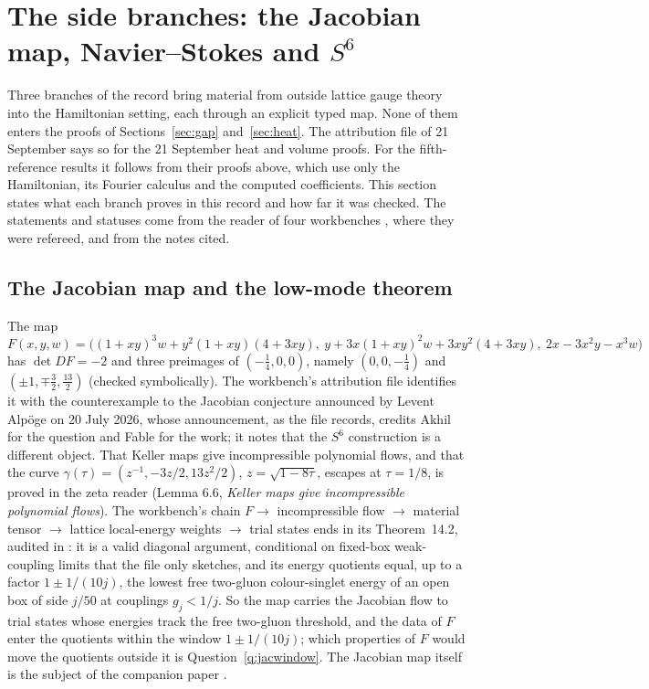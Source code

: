 \section{The side branches: the Jacobian map, Navier--Stokes and \texorpdfstring{$S^6$}{S6}}\label{sec:side}

Three branches of the record bring material from outside lattice gauge theory into the Hamiltonian setting, each through an explicit typed map. None of them enters the proofs of Sections~\ref{sec:gap} and~\ref{sec:heat}. The attribution file of 21 September says so for the 21 September heat and volume proofs. For the fifth-reference results it follows from their proofs above, which use only the Hamiltonian, its Fourier calculus and the computed coefficients. This section states what each branch proves in this record and how far it was checked. The statements and statuses come from the reader of four workbenches \cite{WorkbenchReader}, where they were refereed, and from the notes cited.

\subsection{The Jacobian map and the low-mode theorem}

The map
\[
F(x,y,w)=\bigl((1+xy)^3w+y^2(1+xy)(4+3xy),\ y+3x(1+xy)^2w+3xy^2(4+3xy),\ 2x-3x^2y-x^3w\bigr)
\]
has $\det DF=-2$ and three preimages of $(-\frac14,0,0)$, namely $(0,0,-\frac14)$ and $(\pm1,\mp\frac32,\frac{13}2)$ (checked symbolically). The workbench's attribution file identifies it with the counterexample to the Jacobian conjecture announced by Levent Alpöge on 20 July 2026, whose announcement, as the file records, credits Akhil for the question and Fable for the work; it notes that the $S^6$ construction is a different object. That Keller maps give incompressible polynomial flows, and that the curve $\gamma(\tau)=(z^{-1},-3z/2,13z^2/2)$, $z=\sqrt{1-8\tau}$, escapes at $\tau=1/8$, is proved in the zeta reader \cite{ZetaReader} (Lemma 6.6, \emph{Keller maps give incompressible polynomial flows}).
The workbench's chain $F\to$ incompressible flow $\to$ material tensor $\to$ lattice local-energy weights $\to$ trial states ends in its Theorem~14.2, audited in : it is a valid diagonal argument, conditional on fixed-box weak-coupling limits that the file only sketches, and its energy quotients equal, up to a factor $1\pm1/(10j)$, the lowest free two-gluon colour-singlet energy of an open box of side $j/50$ at couplings $g_j<1/j$. So the map carries the Jacobian flow to trial states whose energies track the free two-gluon threshold, and the data of $F$ enter the quotients within the window $1\pm1/(10j)$; which properties of $F$ would move the quotients outside it is Question~\ref{q:jacwindow}. The Jacobian map itself is the subject of the companion paper \cite{JacobianPaper}.

